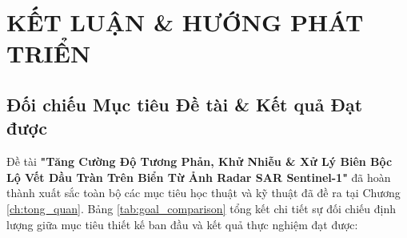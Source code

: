 \chapter{KẾT LUẬN \& HƯỚNG PHÁT TRIỂN}
\label{ch:ket_luan}

\section{Đối chiếu Mục tiêu Đề tài \& Kết quả Đạt được}
Đề tài \textbf{"Tăng Cường Độ Tương Phản, Khử Nhiễu \& Xử Lý Biên Bộc Lộ Vết Dầu Tràn Trên Biển Từ Ảnh Radar SAR Sentinel-1"} đã hoàn thành xuất sắc toàn bộ các mục tiêu học thuật và kỹ thuật đã đề ra tại Chương \ref{ch:tong_quan}. Bảng \ref{tab:goal_comparison} tổng kết chi tiết sự đối chiếu định lượng giữa mục tiêu thiết kế ban đầu và kết quả thực nghiệm đạt được:

